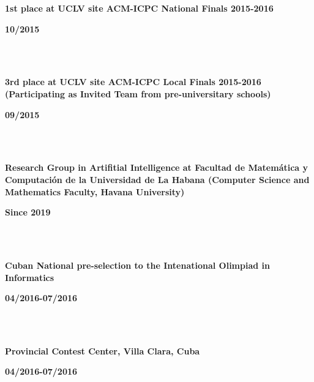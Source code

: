 \documentclass{article}
\begin{document}
\begin{minipage}{0.8\textwidth}
    \parbox{0.8\linewidth}{\textbf{1st place at UCLV site ACM-ICPC National Finals 2015-2016 }} \hfill \textbf{10/2015}\\
    \\
\end{minipage} \\
\begin{minipage}{0.8\textwidth}
    \parbox{0.8\linewidth}{\textbf{3rd  place at UCLV site ACM-ICPC Local Finals 2015-2016 (Participating as  Invited Team from pre-universitary schools)}} \hfill \textbf{09/2015}\\
    \\
\end{minipage}\\

\begin{minipage}{0.8\textwidth}
    \parbox{0.8\linewidth}{\textbf{Research Group in Artifitial Intelligence at Facultad de Matemática y Computación de la Universidad de La Habana (Computer Science and Mathematics Faculty, Havana University)
    }} \hfill \textbf{Since 2019}\\
    \\
\end{minipage}\\
\begin{minipage}{0.8\textwidth}
    \parbox{0.8\linewidth}{\textbf{Cuban National pre-selection to the Intenational Olimpiad in Informatics
    }} \hfill \textbf{04/2016-07/2016}\\
    \\
\end{minipage}\\
\begin{minipage}{0.8\textwidth}
    \parbox{0.8\linewidth}{\textbf{Provincial Contest Center, Villa Clara, Cuba
    }} \hfill \textbf{04/2016-07/2016}\\
    \\
\end{minipage}\\

\newpage
\end{document}
